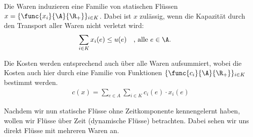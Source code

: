 

\begin{definition}
    Die Waren induzieren eine Familie von statischen Flüssen
    $x = \{\func{x_i}{\A}{\R_+}\}_{i \in K}$. Dabei ist $x$ zulässig, wenn die
    Kapazität durch den Transport aller Waren nicht verletzt wird:
    \begin{align*}
        & \sum_{i \in K} x_i(e) \leq u(e) \quad \text{, alle } e \in \A.
    \end{align*}

    Die Kosten werden entsprechend auch über alle Waren aufsummiert,
    wobei die Kosten auch hier durch eine Familie von Funktionen
    $\{\func{c_i}{\A}{\R_+}\}_{i \in K}$ bestimmt werden.
    \begin{align*}
        & c(x) = \sum_{e \in A} \sum_{i \in K} c_i(e) \cdot x_i(e)
    \end{align*}
\end{definition}

Nachdem wir nun statische Flüsse ohne Zeitkomponente kennengelernt haben,
wollen wir Flüsse über Zeit (dynamische Flüsse) betrachten. Dabei sehen
wir uns direkt Flüsse mit mehreren Waren an.

